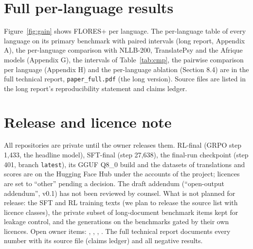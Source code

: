 \section{Full per-language results}\label{app:perlang}
Figure~\ref{fig:gain} shows FLORES+ per language. The per-language table of every language on its primary benchmark with paired intervals (long report, Appendix A), the per-language comparison with NLLB-200, TranslatePsy and the Afrique models (Appendix G), the intervals of Table~\ref{tab:cmp}, the pairwise comparison per language (Appendix H) and the per-language ablation (Section 8.4) are in the full technical report, \texttt{paper\_full.pdf} (the long version). Source files are listed in the long report's reproducibility statement and claims ledger.

\section{Release and licence note}\label{app:release}
All repositories are private until the owner releases them. RL-final (GRPO step 1,433, the headline model), SFT-final (step 27,638), the final-run checkpoint (step 401, branch \texttt{latest}), its GGUF Q8\_0 build and the datasets of translations and scores are on the Hugging Face Hub under the accounts of the project; licences are set to ``other'' pending a decision. The draft addendum (``open-output addendum'', v0.1) has not been reviewed by counsel. What is not planned for release: the SFT and RL training texts (we plan to release the source list with licence classes), the private subset of long-document benchmark items kept for leakage control, and the generations on the benchmarks gated by their own licences. Open owner items: , , , . The full technical report documents every number with its source file (claims ledger) and all negative results.

